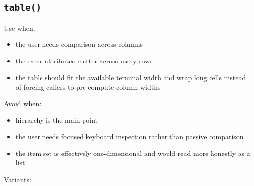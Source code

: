 \subsection{\texorpdfstring{\texttt{t\allowbreak{}a\allowbreak{}b\allowbreak{}l\allowbreak{}e\allowbreak{}(\allowbreak{})}}{}}\label{record-023-table}

Use when:

\begin{itemize}
\tightlist
\item
  the user needs comparison across columns
\item
  the same attributes matter across many rows
\item
  the table should fit the available terminal width and wrap long cells instead of forcing callers to pre-compute column widths
\end{itemize}

Avoid when:

\begin{itemize}
\tightlist
\item
  hierarchy is the main point
\item
  the user needs focused keyboard inspection rather than passive comparison
\item
  the item set is effectively one-dimensional and would read more honestly as a list
\end{itemize}

Variants:

